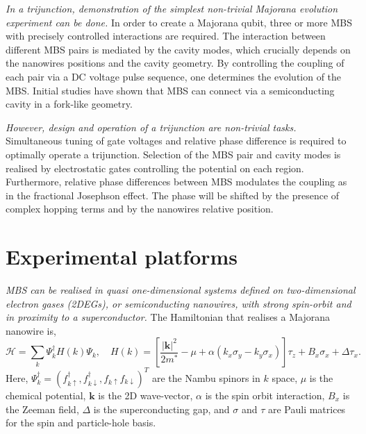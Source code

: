 \textit{In a trijunction, demonstration of the simplest non-trivial Majorana evolution experiment can be done.}
In order to create a Majorana qubit, three or more MBS with precisely controlled interactions are required.
The interaction between different MBS pairs is mediated by the cavity modes, which crucially depends on the nanowires positions and the cavity geometry.
By controlling the coupling of each pair via a DC voltage pulse sequence, one determines the evolution of the MBS.
Initial studies\cite{Hell2016} have shown that MBS can connect via a semiconducting cavity in a fork-like geometry.

\textit{However, design and operation of a trijunction are non-trivial tasks.}
Simultaneous tuning of gate voltages and relative phase difference is required to optimally operate a trijunction.
Selection of the MBS pair and cavity modes is realised by electrostatic gates controlling the potential on each region.
Furthermore, relative phase differences between MBS modulates the coupling as in the fractional Josephson effect.
The phase will be shifted by the presence of complex hopping terms and by the nanowires relative position.

\section{Experimental platforms}

\textit{MBS can be realised in quasi one-dimensional systems defined on two-dimensional electron gases (2DEGs), or semiconducting nanowires, with strong spin-orbit and in proximity to a superconductor.}
The Hamiltonian that realises a Majorana nanowire is,
\begin{equation}\label{eq:ham_maj}
\mathcal{H} = \sum_k \Psi_k^\dagger H(k) \Psi_k  ,\quad H(k) =  \left[ \frac{|\mathbf{k}|^2}{2 m^*} - \mu + \alpha(k_x \sigma_y - k_y \sigma_x) \right] \tau_z + B_x \sigma_x  + \Delta \tau_x.
\end{equation}
Here, $\Psi_k^\dagger = (f_{k\uparrow}^\dagger, f_{k\downarrow}^\dagger, f_{k\uparrow} f_{k\downarrow})^T$ are the Nambu spinors in $k$ space, $\mu$ is the chemical potential, $\mathbf{k}$ is the 2D wave-vector, $\alpha$ is the spin orbit interaction, $B_x$ is the Zeeman field, $\Delta$ is the superconducting gap, and $\sigma$ and $\tau$ are Pauli matrices for the spin and particle-hole basis.

